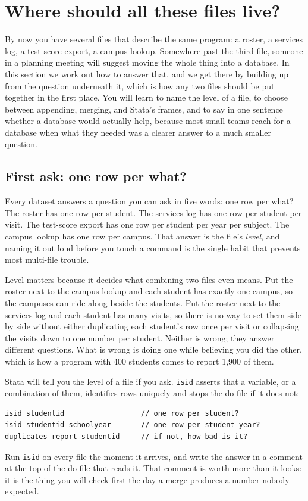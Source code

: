 \documentclass[
    a4paper,
    fontsize=10pt,
    twoside=true,
    numbers=noenddot,
]{kaobook}
\begin{document}
\section{Where should all these files live?}\label{sec:ch06-database}
By now you have several files that describe the same program: a roster, a services log, a test-score export, a campus lookup. Somewhere past the third file, someone in a planning meeting will suggest moving the whole thing into a database. In this section we work out how to answer that, and we get there by building up from the question underneath it, which is how any two files should be put together in the first place. You will learn to name the level of a file, to choose between appending, merging, and Stata's frames, and to say in one sentence whether a database would actually help, because most small teams reach for a database when what they needed was a clearer answer to a much smaller question.

\subsection{First ask: one row per what?}\label{sec:ch06-grain}
Every dataset answers a question you can ask in five words: one row per what? The roster has one row per student. The services log has one row per student per visit. The test-score export has one row per student per year per subject. The campus lookup has one row per campus. That answer is the file's \emph{level}, and naming it out loud before you touch a command is the single habit that prevents most multi-file trouble.

Level matters because it decides what combining two files even means. Put the roster next to the campus lookup and each student has exactly one campus, so the campuses can ride along beside the students. Put the roster next to the services log and each student has many visits, so there is no way to set them side by side without either duplicating each student's row once per visit or collapsing the visits down to one number per student. Neither is wrong; they answer different questions. What is wrong is doing one while believing you did the other, which is how a program with 400 students comes to report 1,900 of them.

Stata will tell you the level of a file if you ask. \texttt{isid} asserts that a variable, or a combination of them, identifies rows uniquely and stops the do-file if it does not:
\par
{\footnotesize
\begin{verbatim}
isid studentid                  // one row per student?
isid studentid schoolyear       // one row per student-year?
duplicates report studentid     // if not, how bad is it?
\end{verbatim}
}
Run \texttt{isid} on every file the moment it arrives, and write the answer in a comment at the top of the do-file that reads it. That comment is worth more than it looks: it is the thing you will check first the day a merge produces a number nobody expected.
\end{document}
